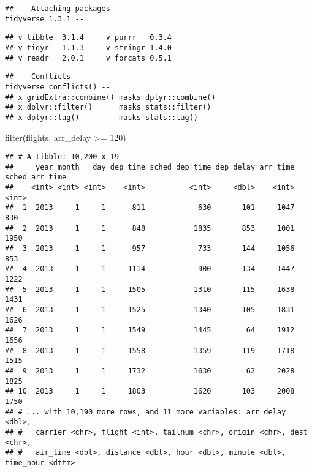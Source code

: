 \documentclass[
]{article}
\newenvironment{Shaded}{\begin{snugshade}}{\end{snugshade}}
\newcommand{\DecValTok}[1]{\textcolor[rgb]{0.00,0.00,0.81}{#1}}
\newcommand{\FunctionTok}[1]{\textcolor[rgb]{0.00,0.00,0.00}{#1}}
\newcommand{\NormalTok}[1]{#1}
\newcommand{\SpecialCharTok}[1]{\textcolor[rgb]{0.00,0.00,0.00}{#1}}
\begin{document}
\begin{verbatim}
## -- Attaching packages --------------------------------------- tidyverse 1.3.1 --
\end{verbatim}

\begin{verbatim}
## v tibble  3.1.4     v purrr   0.3.4
## v tidyr   1.1.3     v stringr 1.4.0
## v readr   2.0.1     v forcats 0.5.1
\end{verbatim}

\begin{verbatim}
## -- Conflicts ------------------------------------------ tidyverse_conflicts() --
## x gridExtra::combine() masks dplyr::combine()
## x dplyr::filter()      masks stats::filter()
## x dplyr::lag()         masks stats::lag()
\end{verbatim}

\begin{Shaded}
\begin{Highlighting}[]
\FunctionTok{filter}\NormalTok{(flights, arr\_delay }\SpecialCharTok{\textgreater{}=} \DecValTok{120}\NormalTok{)}
\end{Highlighting}
\end{Shaded}

\begin{verbatim}
## # A tibble: 10,200 x 19
##     year month   day dep_time sched_dep_time dep_delay arr_time sched_arr_time
##    <int> <int> <int>    <int>          <int>     <dbl>    <int>          <int>
##  1  2013     1     1      811            630       101     1047            830
##  2  2013     1     1      848           1835       853     1001           1950
##  3  2013     1     1      957            733       144     1056            853
##  4  2013     1     1     1114            900       134     1447           1222
##  5  2013     1     1     1505           1310       115     1638           1431
##  6  2013     1     1     1525           1340       105     1831           1626
##  7  2013     1     1     1549           1445        64     1912           1656
##  8  2013     1     1     1558           1359       119     1718           1515
##  9  2013     1     1     1732           1630        62     2028           1825
## 10  2013     1     1     1803           1620       103     2008           1750
## # ... with 10,190 more rows, and 11 more variables: arr_delay <dbl>,
## #   carrier <chr>, flight <int>, tailnum <chr>, origin <chr>, dest <chr>,
## #   air_time <dbl>, distance <dbl>, hour <dbl>, minute <dbl>, time_hour <dttm>
\end{verbatim}
\end{document}
